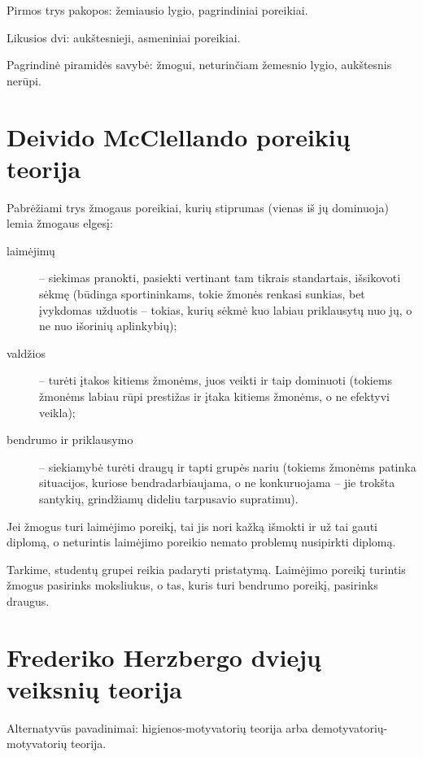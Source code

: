 Pirmos trys pakopos: žemiausio lygio, pagrindiniai poreikiai.

Likusios dvi: aukštesnieji, asmeniniai poreikiai.

Pagrindinė piramidės savybė: žmogui, neturinčiam žemesnio lygio, aukštesnis
nerūpi.

\section{Deivido McClellando poreikių teorija}

Pabrėžiami trys žmogaus poreikiai, kurių stiprumas (vienas iš jų dominuoja)
lemia žmogaus elgesį:
\begin{description}
  \item[laimėjimų] – siekimas pranokti, pasiekti vertinant tam tikrais
    standartais, išsikovoti sėkmę (būdinga sportininkams,
    tokie žmonės renkasi sunkias, bet įvykdomas užduotis – tokias, kurių
    sėkmė kuo labiau priklausytų nuo jų, o ne nuo išorinių aplinkybių);
  \item[valdžios] – turėti įtakos kitiems žmonėms, juos veikti ir
    taip dominuoti (tokiems žmonėms labiau rūpi prestižas ir įtaka
    kitiems žmonėms, o ne efektyvi veikla);
  \item[bendrumo ir priklausymo] – siekiamybė turėti draugų ir tapti
    grupės nariu (tokiems žmonėms patinka situacijos, kuriose
    bendradarbiaujama, o ne konkuruojama – jie trokšta santykių,
    grindžiamų dideliu tarpusavio supratimu).
\end{description}

\begin{exmp}
  Jei žmogus turi laimėjimo poreikį, tai jis nori kažką išmokti ir už
  tai gauti diplomą, o neturintis laimėjimo poreikio nemato problemų
  nusipirkti diplomą.
\end{exmp}

\begin{exmp}
  Tarkime, studentų grupei reikia padaryti pristatymą. Laimėjimo poreikį
  turintis žmogus pasirinks moksliukus, o tas, kuris turi bendrumo
  poreikį, pasirinks draugus.
\end{exmp}

\section{Frederiko Herzbergo dviejų veiksnių teorija}

Alternatyvūs pavadinimai: higienos-motyvatorių teorija arba
demotyvatorių-motyvatorių teorija.

